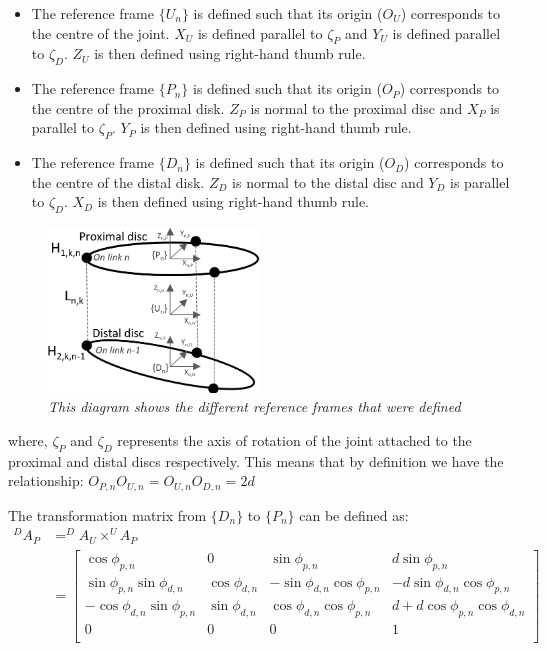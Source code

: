 \documentclass[a4paper,12pt]{report}
\begin{document}
\begin{itemize}
	\item The reference frame $\{U_n\}$ is defined such that its origin ($O_U$) corresponds to the centre of the joint. $X_U$ is defined parallel to $\zeta_P$ and $Y_U$ is defined parallel to $\zeta_D$. $Z_U$ is then defined using right-hand thumb rule.
	\item The reference frame $\{P_n\}$ is defined such that its origin ($O_P$) corresponds to the centre of the proximal disk. $Z_P$ is normal to the proximal disc and $X_P$ is parallel to $\zeta_P$. $Y_P$ is then defined using right-hand thumb rule.
	\item The reference frame $\{D_n\}$ is defined such that its origin ($O_D$) corresponds to the centre of the distal disk. $Z_D$ is normal to the distal disc and $Y_D$ is parallel to $\zeta_D$. $X_D$ is then defined using right-hand thumb rule.
\end{itemize}
\begin{figure}[H]
	\centering
	\includegraphics[width=0.5\textwidth]{images/Refrence_frames.png}
	\caption{\textit{This diagram shows the different reference frames that were defined}}
	\label{ref-frames}
\end{figure}
where, $\zeta_P$ and $\zeta_D$ represents the axis of rotation of the joint attached to the proximal and distal discs respectively.
This means that by definition we have the relationship: $O_{P,n}O_{U,n}=O_{U,n}O_{D,n}=2d$


The transformation matrix from $\{D_n\}$ to $\{P_n\}$ can be defined as: 
\begin{equation}
\begin{aligned}
^DA_P&=^DA_U \times ^UA_P \\ 
&= \begin{bmatrix}
\cos{\phi_{p,n}}&0&\sin{\phi_{p,n}}&d\sin{\phi_{p,n}}\\
\sin{\phi_{p,n}}\sin{\phi_{d,n}}&\cos{\phi_{d,n}}&-\sin{\phi_{d,n}}\cos{\phi_{p,n}}&-d\sin{\phi_{d,n}}\cos{\phi_{p,n}}\\
-\cos{\phi_{d,n}}\sin{\phi_{p,n}}&\sin{\phi_{d,n}}&\cos{\phi_{d,n}}\cos{\phi_{p,n}}&d+d\cos{\phi_{p,n}}\cos{\phi_{d,n}}\\
0&0&0&1\\
\end{bmatrix}\\
\end{aligned}
\end{equation}
\end{document}
